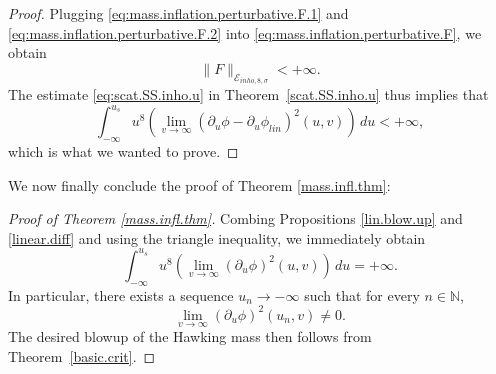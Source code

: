 \documentclass[10pt, reqno]{amsart}
\theoremstyle{definition}
\theoremstyle{remark}
\numberwithin{equation}{section}
\newcommand{\rd}{\partial}
\newcommand{\0}{\emptyset}
\begin{document}
\begin{proof}
Plugging \eqref{eq:mass.inflation.perturbative.F.1} and \eqref{eq:mass.inflation.perturbative.F.2} into \eqref{eq:mass.inflation.perturbative.F}, we obtain
$$\|F\|_{\mathcal E_{inho,8,\sigma}} <+\infty.$$
The estimate \eqref{eq:scat.SS.inho.u} in Theorem~\ref{scat.SS.inho.u} thus implies that
$$\int_{-\infty}^{u_s} u^{8}\left(\lim_{v\to\infty} (\rd_u\phi-\rd_u\phi_{lin})^2 (u,v)\right)\, du < +\infty, $$
which is what we wanted to prove. \qedhere
\end{proof}

We now finally conclude the proof of Theorem \ref{mass.infl.thm}:
\begin{proof}[Proof of Theorem \ref{mass.infl.thm}]
Combing Propositions \ref{lin.blow.up} and \ref{linear.diff} and using the triangle inequality, we immediately obtain 
$$\int_{-\infty}^{u_s} u^{8}\left(\lim_{v\to\infty} (\rd_u\phi)^2 (u,v)\right)\, du = +\infty.$$
In particular, there exists a sequence $u_n\to -\infty$ such that for every $n\in \mathbb N$,
$$\lim_{v\to\infty} (\rd_u\phi)^2 (u_n,v)\neq 0.$$
The desired blowup of the Hawking mass then follows from Theorem~\ref{basic.crit}.
\end{proof}



\end{document}
